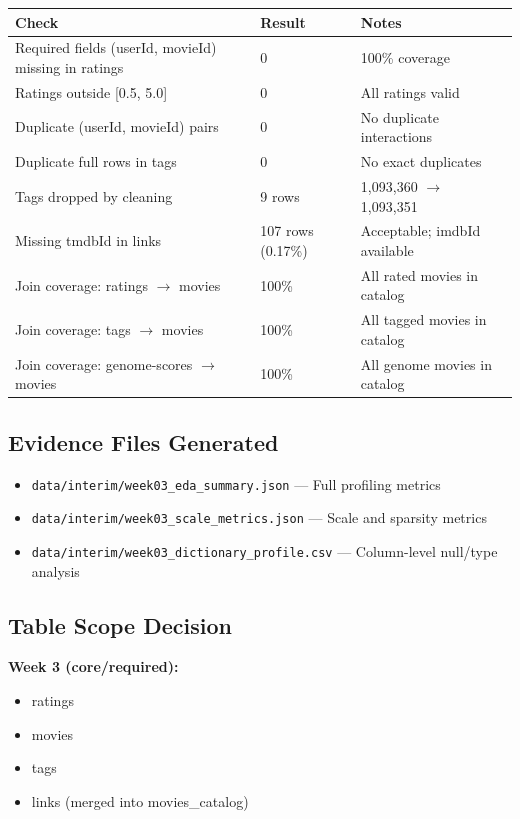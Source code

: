 \documentclass[11pt]{article}
\begin{document}
\begin{longtable}{@{}p{}p{}p{}@{}}
\toprule
\textbf{Check} & \textbf{Result} & \textbf{Notes} \\
\midrule
\endhead
Required fields (userId, movieId) missing in ratings & 0 & 100\% coverage \\
Ratings outside [0.5, 5.0] & 0 & All ratings valid \\
Duplicate (userId, movieId) pairs & 0 & No duplicate interactions \\
Duplicate full rows in tags & 0 & No exact duplicates \\
Tags dropped by cleaning & 9 rows & 1,093,360 $\rightarrow$ 1,093,351 \\
Missing tmdbId in links & 107 rows (0.17\%) & Acceptable; imdbId available \\
Join coverage: ratings $\rightarrow$ movies & 100\% & All rated movies in catalog \\
Join coverage: tags $\rightarrow$ movies & 100\% & All tagged movies in catalog \\
Join coverage: genome-scores $\rightarrow$ movies & 100\% & All genome movies in catalog \\
\bottomrule
\end{longtable}

\subsection{Evidence Files Generated}

\begin{itemize}[leftmargin=1.5em]
    \item \texttt{data/interim/week03\_eda\_summary.json} --- Full profiling metrics
    \item \texttt{data/interim/week03\_scale\_metrics.json} --- Scale and sparsity metrics
    \item \texttt{data/interim/week03\_dictionary\_profile.csv} --- Column-level null/type analysis
\end{itemize}

\subsection{Table Scope Decision}

\textbf{Week 3 (core/required):}

\begin{itemize}[leftmargin=1.5em]
    \item ratings
    \item movies
    \item tags
    \item links (merged into movies\_catalog)
\end{itemize}
\end{document}
